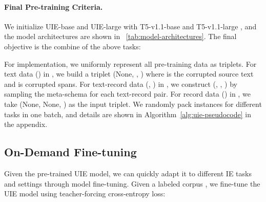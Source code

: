 \documentclass[11pt]{article}
\begin{document}
\paragraph{Final Pre-training Criteria.}
We initialize UIE-base and UIE-large with T5-v1.1-base and T5-v1.1-large \citep{2020t5}, and the model architectures are shown in \tablename~\ref{tab:model-architectures}.
The final objective is the combine of the above tasks:

For implementation, we uniformly represent all pre-training data as triplets.
For text data () in , we build a triplet (None, , ) where   is the corrupted source text and  is corrupted spans.
For text-record data (, ) in , we construct (, , ) by sampling the meta-schema  for each text-record pair.
For record data () in , we take (None, None, ) as the input triplet.
We randomly pack instances for different tasks in one batch, and details are shown in Algorithm~\ref{alg:uie-pseudocode} in the appendix.


\subsection{On-Demand Fine-tuning}
Given the pre-trained UIE model, we can quickly adapt it to different IE tasks and settings through model fine-tuning.
Given a labeled corpus , we fine-tune the UIE model using teacher-forcing cross-entropy loss:
\end{document}
